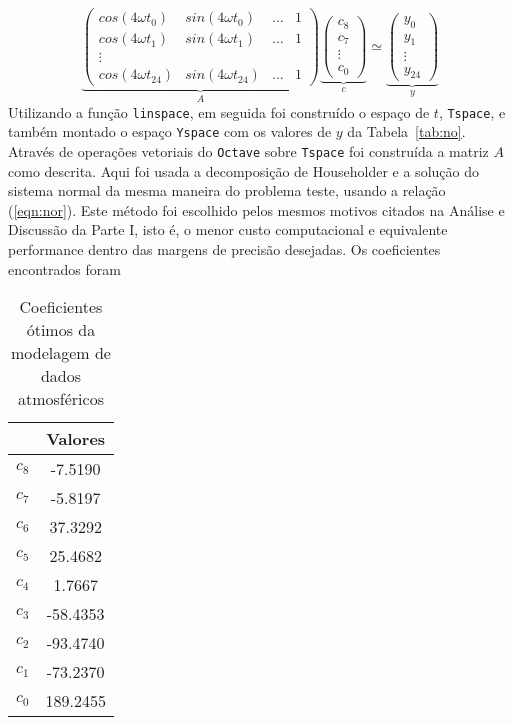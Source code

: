 \documentclass[a4paper, 12pt]{article}
\begin{document}
\[
\underbrace{
\begin{pmatrix}
cos(4\omega t_0)&sin(4\omega t_0)&\hdots&1\\
cos(4\omega t_1)&sin(4\omega t_1)&\hdots&1\\
\vdots \\
cos(4\omega t_{24})&sin(4\omega t_{24})&\hdots&1
\end{pmatrix}}_A
\underbrace{
\begin{pmatrix}
c_8\\
c_7\\
\vdots \\
c_0
\end{pmatrix}}_c
\simeq
\underbrace{
\begin{pmatrix}
y_0\\
y_1\\
\vdots \\
y_{24}
\end{pmatrix}}_y
\]
Utilizando a função \verb+linspace+, em seguida foi construído o espaço de $t$, \verb+Tspace+, e também montado o espaço \verb+Yspace+ com os valores de $y$ da Tabela~\ref{tab:no}. Através de operações vetoriais do \verb+Octave+ sobre \verb+Tspace+ foi construída a matriz $A$ como descrita. Aqui foi usada a decomposição de Householder e a solução do sistema normal da mesma maneira do problema teste, usando a relação (\ref{eqn:nor}). Este método foi escolhido pelos mesmos motivos citados na Análise e Discussão da Parte I, isto é, o menor custo computacional e equivalente performance dentro das margens de precisão desejadas. Os coeficientes encontrados foram
\begin{table}[h]
\centering
\caption{\label{tab:coef2} Coeficientes ótimos da modelagem de dados atmosféricos}
\begin{tabular}{|c||c|}
\hline&Valores\\
\hline\hline$c_8$&-7.5190\\
\hline$c_7$&    -5.8197\\
\hline$c_6$&    37.3292\\
\hline$c_5$&    25.4682\\
\hline$c_4$&     1.7667\\
\hline$c_3$&   -58.4353\\
\hline$c_2$&   -93.4740\\
\hline$c_1$&   -73.2370\\
\hline$c_0$&   189.2455\\ \hline
\end{tabular}
\end{table}
\end{document}
